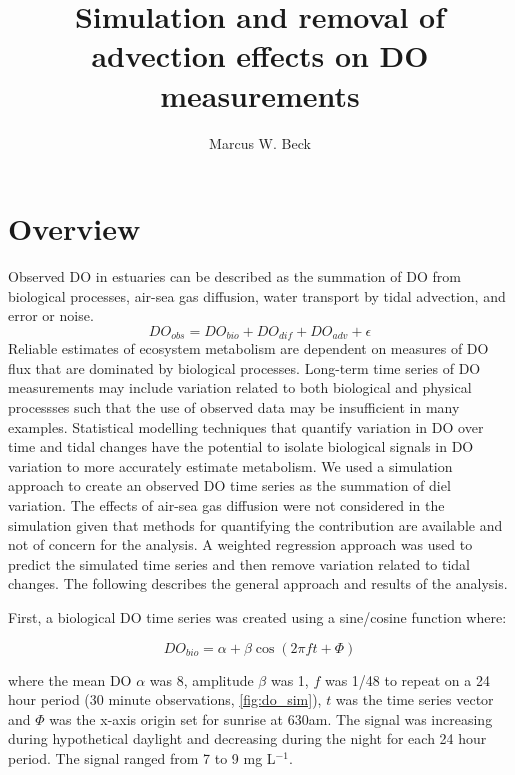 \documentclass{article}\usepackage{graphicx, color}
\begin{document}
\setlength{\parskip}{5mm}
\setlength{\parindent}{0in}

\title{Simulation and removal of advection effects on DO measurements}
\author{Marcus W. Beck}
\maketitle

\section{Overview}

Observed DO in estuaries can be described as the summation of DO from biological processes, air-sea gas diffusion, water transport by tidal advection, and error or noise.  
\begin{equation} \label{eqn:one}
DO_{obs} = DO_{bio} + DO_{dif} + DO_{adv} + \epsilon
\end{equation}
Reliable estimates of ecosystem metabolism are dependent on measures of DO flux that are dominated by biological processes.  Long-term time series of DO measurements may include variation related to both biological and physical processses such that the use of observed data may be insufficient in many examples.  Statistical modelling techniques that quantify variation in DO over time and tidal changes have the potential to isolate biological signals in DO variation to more accurately estimate metabolism.  We used a simulation approach to create an observed DO time series as the summation of diel variation.  The effects of air-sea gas diffusion were not considered in the simulation given that methods for quantifying the contribution are available and not of concern for the analysis.  A weighted regression approach was used to predict the simulated time series and then remove variation related to tidal changes.  The following describes the general approach and results of the analysis.

First, a biological DO time series was created using a sine/cosine function where:

\begin{equation} \label{eqn:bio}
DO_{bio} = \alpha + \beta\cos\left(2\pi ft + \Phi\right)
\end{equation}

where the mean DO $\alpha$ was 8, amplitude $\beta$ was 1, $f$ was 1/48 to repeat on a 24 hour period (30 minute observations, \cref{fig:do_sim}), $t$ was the time series vector and $\Phi$ was the x-axis origin set for sunrise at 630am.  The signal was increasing during hypothetical daylight and decreasing during the night for each 24 hour period.  The signal ranged from 7 to 9 mg L$^{-1}$.
\end{document}
